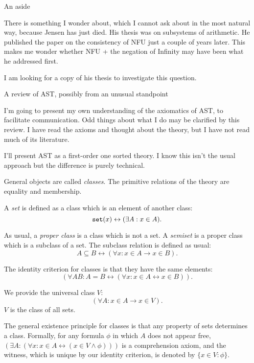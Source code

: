 \documentclass{slides}
\begin{document}
\begin{slide}
{\Large An aside}

There is something I wonder about, which I cannot ask about in the most natural way, because Jensen has just died.
His thesis was on subsystems of arithmetic.  He published the paper on the consistency of NFU just a couple of years later.  This makes me wonder whether NFU + the negation of Infinity may have been what he addressed first.

I am looking for a copy of his thesis to investigate this question.

\end{slide}

\begin{slide}

{\Large A review of AST, possibly from an unusual standpoint}

I'm going to present my own understanding of the axiomatics of AST, to facilitate communication.  Odd things about what I do may be clarified by this review.  I have read the axioms and thought about the theory, but I have not read much of its literature.


\end{slide}

\begin{slide}

I'll present AST as a first-order one sorted theory.  I know this isn't the usual approach but the difference is purely technical.

General objects are called {\em classes\/}.  The primitive relations of the theory are equality and membership.

A {\em set\/} is defined as a class which is an element of another class:  $${\tt set}(x) \leftrightarrow (\exists A:x \in A).$$

As usual, a {\em proper class\/} is a class which is not a set.  A {\em semiset\/} is a proper class which is a subclass of a set.  The subclass relation is defined as usual:  $$A \subseteq B \leftrightarrow (\forall x:x \in A \rightarrow x \in B).$$

\end{slide}

\begin{slide}

The identity criterion for classes is that they have the same elements:  $$(\forall AB: A = B \leftrightarrow (\forall x:x \in A \leftrightarrow x \in B)).$$

We provide the universal class $V$:  $$(\forall A:x \in A \rightarrow x \in V).$$  $V$ is the class of all sets.

The general existence principle for classes is that any property of sets determines a class.  Formally, for any formula $\phi$ in which $A$ does not appear free, $(\exists A:(\forall x:x \in A \leftrightarrow (x \in V \wedge \phi)))$ is a comprehension axiom,
and the witness, which is unique by our identity criterion, is denoted by $\{x \in V:\phi\}$.


\end{slide}
\end{document}
